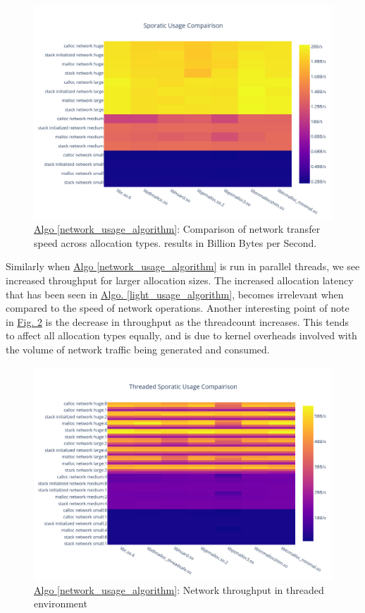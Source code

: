 \documentclass[letterpaper, 10 pt, conference]{ieeeconf}  %
\begin{document}
\begin{figure}[tbh!]
  \centering
  \includegraphics[width=\columnwidth]{graphs/sporatic_hist.png}
  \caption{ \hyperref[network_usage_algorithm]{Algo \ref{network_usage_algorithm}}: Comparison of network transfer speed across allocation types. results in Billion Bytes per Second. }
  \label{algo3_complete_hist}
\end{figure}

Similarly when \hyperref[network_usage_algorithm]{Algo \ref*{network_usage_algorithm}} is run in parallel threads, we see increased throughput for larger allocation sizes.
The increased allocation latency that has been seen in \hyperref[light_usage_algorithm]{Algo. \ref*{light_usage_algorithm}}, becomes irrelevant when compared to the speed of network operations.
Another interesting point of note in \hyperref[algo3_complete_threaded_hist]{Fig. \ref*{algo3_complete_threaded_hist}} is the decrease in throughput as the threadcount increases.
This tends to affect all allocation types equally, and is due to kernel overheads involved with the volume of network traffic being generated and consumed.

\begin{figure}[tbh!]
  \centering
  \includegraphics[width=\columnwidth]{graphs/sporatic_threaded_hist.png}
  \caption{ \hyperref[network_usage_algorithm]{Algo \ref{network_usage_algorithm}}: Network throughput in threaded environment}
  \label{algo3_complete_threaded_hist}
\end{figure}
\end{document}
